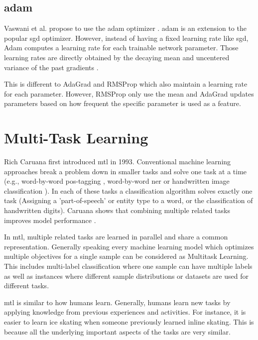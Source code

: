 \subsection{\gls{adam}}

Vaswani et al. propose to use the \acrfull{adam} optimizer \cite{Kingma2014}. \gls{adam} is an extension to the popular \gls{sgd} optimizer. However, instead of having a fixed learning rate like \gls{sgd}, Adam computes a learning rate for each trainable network parameter. Those learning rates are directly obtained by the decaying mean and uncentered variance of the past gradients \cite{Kingma2014}.
\medskip

This is different to AdaGrad \cite{Duchi2011} and RMSProp \cite{Hinton} which also maintain a learning rate for each parameter. However, RMSProp only use the mean and AdaGrad updates parameters based on how frequent the specific parameter is used as a feature.

\section{Multi-Task Learning}

Rich Caruana first introduced \acrfull{mtl} in 1993. Conventional machine learning approaches break a problem down in smaller tasks and solve one task at a time (e.g., word-by-word \gls{pos}-tagging \cite{Toutanova2007}, word-by-word \gls{ner} \cite{Sang2003} or handwritten image classification \cite{LeCun;1990}). In each of these tasks a classification algorithm solves exactly one task (Assigning a 'part-of-speech' or entity type to a word, or the classification of handwritten digits). Caruana shows that combining multiple related tasks improves model performance \cite{Caruana1993}\cite{Caruana1997a}. 

In \gls{mtl}, multiple related tasks are learned in parallel and share a common representation. Generally speaking every machine learning model which optimizes multiple objectives for a single sample can be considered as Multitask Learning. This includes multi-label classification where one sample can have multiple labels as well as instances where different sample distributions or datasets are used for different tasks.

\gls{mtl} is similar to how humans learn. Generally, humans learn new tasks by applying knowledge from previous experiences and activities. For instance, it is easier to learn ice skating when someone previously learned inline skating. This is because all the underlying important aspects of the tasks are very similar.

